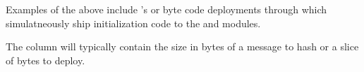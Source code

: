 Examples of the above include 's or byte code deployments through  which simulatneously ship initialization code to the \romMod{} and \kecMod{} modules.

\saNote{} The \microTotalSize{} column will typically contain the size in bytes of a message to hash or a slice of bytes to deploy.

